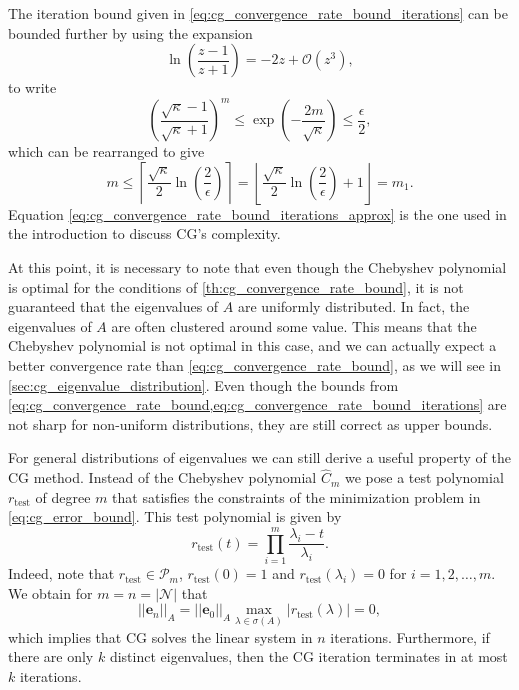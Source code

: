 The iteration bound given in \cref{eq:cg_convergence_rate_bound_iterations} can be bounded further by using the expansion
\[
  \ln\left(\frac{z - 1}{z + 1}\right) = -2z + \mathcal{O}(z^3),
\]
to write
\[
  \left(\frac{\sqrt{\kappa} - 1}{\sqrt{\kappa} + 1}\right)^{m} \leq \exp \left(-\frac{2m}{\sqrt{\kappa}}\right) \leq \frac{\epsilon}{2},
\]
which can be rearranged to give
\begin{equation}
  m \leq \left\lceil\frac{\sqrt{\kappa}}{2}\ln\left(\frac{2}{\epsilon}\right)\right\rceil = \left\lfloor\frac{\sqrt{\kappa}}{2}\ln\left(\frac{2}{\epsilon}\right) + 1\right\rfloor = m_1.
  \label{eq:cg_convergence_rate_bound_iterations_approx}
\end{equation}
Equation \ref{eq:cg_convergence_rate_bound_iterations_approx} is the one used in the introduction to discuss CG's complexity.

At this point, it is necessary to note that even though the Chebyshev polynomial is optimal for the conditions of \cref{th:cg_convergence_rate_bound}, it is not guaranteed that the eigenvalues of $A$ are uniformly distributed. In fact, the eigenvalues of $A$ are often clustered around some value. This means that the Chebyshev polynomial is not optimal in this case, and we can actually expect a better convergence rate than \cref{eq:cg_convergence_rate_bound}, as we will see in \cref{sec:cg_eigenvalue_distribution}. Even though the bounds from \cref{eq:cg_convergence_rate_bound,eq:cg_convergence_rate_bound_iterations} are not sharp for non-uniform distributions, they are still correct as upper bounds.

For general distributions of eigenvalues we can still derive a useful property of the CG method. Instead of the Chebyshev polynomial $\hat{C}_m$ we pose a test polynomial $r_{\textrm{test}}$ of degree $m$ that satisfies the constraints of the minimization problem in \cref{eq:cg_error_bound}. This test polynomial is given by
\[
  r_{\textrm{test}}(t) = \prod_{i=1}^m \frac{\lambda_i - t}{\lambda_i}.
\]
Indeed, note that $r_{\textrm{test}}\in\mathcal{P}_m$, $r_{\textrm{test}}(0) = 1$ and $r_{\textrm{test}}(\lambda_i) = 0$ for $i = 1, 2, \dots, m$. We obtain for $m = n = |\mathcal{N}|$ that
\[
  ||\mathbf{e}_n||_A = ||\mathbf{e}_0||_A \max_{\lambda \in \sigma(A)} |r_{\textrm{test}}(\lambda)| = 0,
\]
which implies that CG solves the linear system in $n$ iterations. Furthermore, if there are only $k$ distinct eigenvalues, then the CG iteration terminates in at most $k$ iterations.

